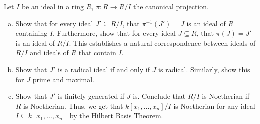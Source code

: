 \documentclass[10pt]{mypackage}
\begin{document}
\begin{exercise}[Exercise 1.22]
Let $I$ be an ideal in a ring $R$, $\pi\colon R\rightarrow R/I$ the canonical projection.
\begin{enumerate}[(a)]
  \item Show that for every ideal $J'\subseteq R/I$, that $\pi^{-1}\left( J' \right) = J$ is an ideal of $R$ containing $I$. Furthermore, show that for every ideal $J\subseteq R$, that $\pi\left( J \right) = J'$ is an ideal of $R/I$. This establishes a natural correspondence between ideals of $R/I$ and ideals of $R$ that contain $I$.
  \item Show that $J'$ is a radical ideal if and only if $J$ is radical. Similarly, show this for $J$ prime and maximal.
  \item Show that $J'$ is finitely generated if $J$ is. Conclude that $R/I$ is Noetherian if $R$ is Noetherian. Thus, we get that $k\left[ x_1,\dots,x_n \right]/I$ is Noetherian for any ideal $I\subseteq k\left[ x_1,\dots,x_n \right]$ by the Hilbert Basis Theorem.
\end{enumerate}
\end{exercise}
\end{document}
